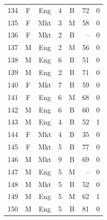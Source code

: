 \documentclass[11pt,a4paper]{article}
\begin{document}
\begin{center}
\begin{tabular}[t]{@{}r c c r c r c@{}}
134 & F & Eng & 4 & B & 72 & 0 \\
135 & F & Mkt & 3 & M & 58 & 0 \\
136 & F & Mkt & 2 & B & -- & 0 \\
137 & M & Eng & 2 & M & 56 & 0 \\
138 & M & Eng & 6 & B & 51 & 0 \\
139 & M & Eng & 2 & B & 71 & 0 \\
140 & F & Mkt & 7 & B & 59 & 0 \\
141 & F & Eng & 6 & M & 68 & 0 \\
142 & M & Eng & 6 & B & 60 & 0 \\
143 & M & Eng & 4 & B & 52 & 1 \\
144 & F & Mkt & 4 & B & 35 & 0 \\
145 & F & Mkt & 5 & B & 77 & 0 \\
146 & M & Mkt & 9 & B & 69 & 0 \\
147 & M & Eng & 5 & M & -- & 0 \\
148 & M & Mkt & 5 & B & 52 & 0 \\
149 & M & Eng & 5 & M & 62 & 1 \\
150 & M & Eng & 5 & B & 81 & 0 \\
\bottomrule
\end{tabular}
\end{center}
\clearpage
\end{document}
